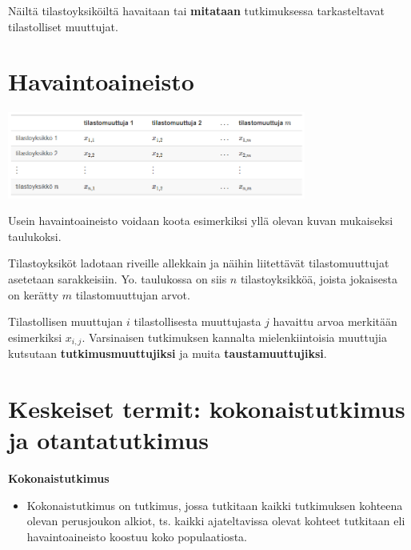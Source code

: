 \documentclass[
]{report}
\providecommand{\tightlist}{%
  \setlength{\itemsep}{0pt}\setlength{\parskip}{0pt}}\usepackage{longtable,booktabs,array}
\begin{document}
Näiltä tilastoyksiköiltä havaitaan tai \textbf{mitataan} tutkimuksessa
tarkasteltavat tilastolliset muuttujat.

\hypertarget{havaintoaineisto}{%
\section{Havaintoaineisto}\label{havaintoaineisto}}

\includegraphics[width=3.86458in,height=\textheight]{havaintoaineisto.png}

Usein havaintoaineisto voidaan koota esimerkiksi yllä olevan kuvan
mukaiseksi taulukoksi.

Tilastoyksiköt ladotaan riveille allekkain ja näihin liitettävät
tilastomuuttujat asetetaan sarakkeisiin. Yo. taulukossa on siis \(n\)
tilastoyksikköä, joista jokaisesta on kerätty \(m\) tilastomuuttujan
arvot.

Tilastollisen muuttujan \(i\) tilastollisesta muuttujasta \(j\) havaittu
arvoa merkitään esimerkiksi \(x_{i,j}\). Varsinaisen tutkimuksen
kannalta mielenkiintoisia muuttujia kutsutaan
\textbf{tutkimusmuuttujiksi} ja muita \textbf{taustamuuttujiksi}.

\hypertarget{keskeiset-termit-kokonaistutkimus-ja-otantatutkimus}{%
\section{Keskeiset termit: kokonaistutkimus ja
otantatutkimus}\label{keskeiset-termit-kokonaistutkimus-ja-otantatutkimus}}

\begin{defblock}{}

\textbf{Kokonaistutkimus}

\begin{itemize}
\tightlist
\item
  Kokonaistutkimus on tutkimus, jossa tutkitaan kaikki tutkimuksen
  kohteena olevan perusjoukon alkiot, ts. kaikki ajateltavissa olevat
  kohteet tutkitaan eli havaintoaineisto koostuu koko populaatiosta.
\end{itemize}

\end{defblock}
\end{document}
